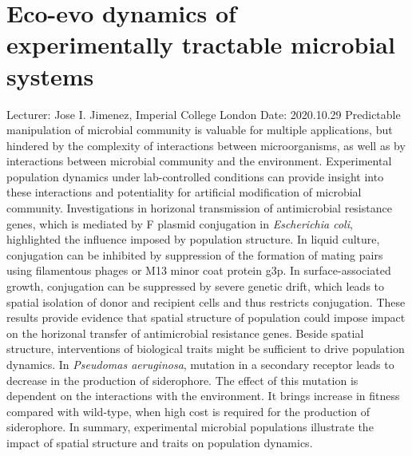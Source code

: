 \documentclass[11pt]{article}
\begin{document}
  \section{Eco-evo dynamics of experimentally tractable microbial systems}
  Lecturer: Jose I. Jimenez, Imperial College London
  \newline
  Date: 2020.10.29
  \newline
  Predictable manipulation of microbial community is valuable for multiple applications, but hindered by the complexity of interactions between microorganisms, as well as by interactions between microbial community and the environment. 
  Experimental population dynamics under lab-controlled conditions can provide insight into these interactions and potentiality for artificial modification of microbial community.
  \newline
  Investigations in horizonal transmission of antimicrobial resistance genes, which is mediated by F plasmid conjugation in \textit{Escherichia coli}, highlighted the influence imposed by population structure.  
  In liquid culture, conjugation can be inhibited by suppression of the formation of mating pairs using filamentous phages or M13 minor coat protein g3p. 
  In surface-associated growth, conjugation can be suppressed by severe genetic drift, which leads to spatial isolation of donor and recipient cells and thus restricts conjugation. 
  These results provide evidence that spatial structure of population could impose impact on the horizonal transfer of antimicrobial resistance genes.
  \newline
  Beside spatial structure, interventions of biological traits might be sufficient to drive population dynamics. 
  In \textit{Pseudomas aeruginosa}, mutation in a secondary receptor leads to decrease in the production of siderophore. 
  The effect of this mutation is dependent on the interactions with the environment. 
  It brings increase in fitness compared with wild-type, when high cost is required for the production of siderophore.
  \newline
  In summary, experimental microbial populations illustrate the impact of spatial structure and traits on population dynamics.

  \newpage
\end{document}
